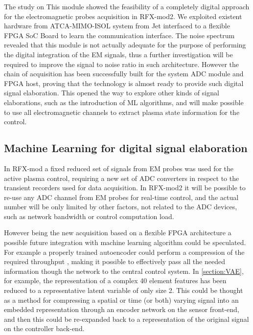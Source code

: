 The study on This module showed the feasibility of a completely digital approach for the electromagnetic probes acquisition in RFX-mod2. We exploited existent hardware from ATCA-MIMO-ISOL system from Jet interfaced to a flexible FPGA SoC Board to learn the communication interface. The noise spectrum revealed that this module is not actually adequate for the purpose of performing the digital integration of the EM signals, thus a further investigation will be required to improve the signal to noise ratio in such architecture. However the chain of acquisition has been successfully built for the system ADC module and FPGA host, proving that the technology is almost ready to provide such digital signal elaboration.
This opened the way to explore other kinds of signal elaborations, such as the introduction of ML algorithms, and will make possible to use all electromagnetic channels to extract plasma state information for the control.






\subsection*{Machine Learning for digital signal elaboration}

In RFX-mod a fixed reduced set of signals from EM probes was used for the active plasma control, requiring a new set of ADC converters in respect to the transient recorders used for data acquisition. In RFX-mod2 it will be possible to re-use any ADC channel from EM probes for real-time control, and the actual number will be only limited by other factors, not related to the ADC devices, such as network bandwidth or control computation load. 

However being the new acquisition based on a flexible FPGA architecture a possible future integration with machine learning algorithm could be speculated.
For example a properly trained autoencoder could perform a compression of the required throughput \cite{Zebang:2019:DCA:3313950.3313965}, making it possible to effectively pass all the needed information though the network to the central control system.
In \cref{section:VAE}, for example, the representation of a complex 40 element features has been reduced to a representative latent variable of only size 2. 
This could be thought as a method for compressing a spatial or time (or both) varying signal into an embedded representation through an encoder network on the sensor front-end, and then this could be re-expanded back to a representation of the original signal on the controller back-end.

